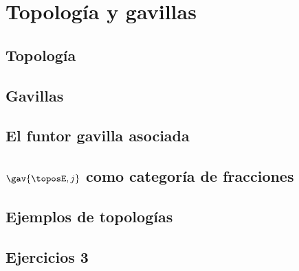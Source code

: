 \chapter{Topología y gavillas}
\label{chap:3}

\section{Topología}
\label{sec:3.1}

\section{Gavillas}
\label{sec:3.2}

\section{El funtor gavilla asociada}
\label{sec:3.3}

\section{\(\gav{\toposE,j}\) como categoría de fracciones}
\label{sec:3.4}

\section{Ejemplos de topologías}
\label{sec:3.5}

\section*{Ejercicios 3}
\label{sec:ejercicios-3}
